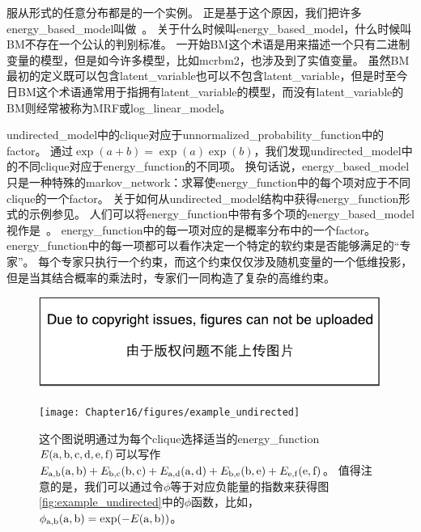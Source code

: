 服从形式的任意分布都是的一个实例。
正是基于这个原因，我们把许多\gls{energy_based_model}叫做~\citep{Fahlman83,Ackley85,Hinton84,Hinton86a}。
关于什么时候叫\gls{energy_based_model}，什么时候叫\gls{BM}不存在一个公认的判别标准。
一开始\gls{BM}这个术语是用来描述一个只有二进制变量的模型，但是如今许多模型，比如\gls{mcrbm2}，也涉及到了实值变量。
虽然\gls{BM}最初的定义既可以包含\gls{latent_variable}也可以不包含\gls{latent_variable}，但是时至今日\gls{BM}这个术语通常用于指拥有\gls{latent_variable}的模型，而没有\gls{latent_variable}的\gls{BM}则经常被称为\gls{MRF}或\gls{log_linear_model}。



\gls{undirected_model}中的\gls{clique}对应于\gls{unnormalized_probability_function}中的\gls{factor}。 
通过$\exp(a+b) = \exp(a) \exp(b)$，我们发现\gls{undirected_model}中的不同\gls{clique}对应于\gls{energy_function}的不同项。
换句话说，\gls{energy_based_model}只是一种特殊的\gls{markov_network}：求幂使\gls{energy_function}中的每个项对应于不同\gls{clique}的一个\gls{factor}。
关于如何从\gls{undirected_model}结构中获得\gls{energy_function}形式的示例参见。
人们可以将\gls{energy_function}中带有多个项的\gls{energy_based_model}视作是~\citep{Hinton99}。
\gls{energy_function}中的每一项对应的是概率分布中的一个\gls{factor}。
\gls{energy_function}中的每一项都可以看作决定一个特定的软约束是否能够满足的``专家''。
每个专家只执行一个约束，而这个约束仅仅涉及随机变量的一个低维投影，但是当其结合概率的乘法时，专家们一同构造了复杂的高维约束。



\begin{figure}[!htb]
\ifOpenSource
\centerline{\includegraphics{figure.pdf}}
\else
	\centerline{\texttt{[image: Chapter16/figures/example\_undirected]}}
\fi
\caption{这个图说明通过为每个\gls{clique}选择适当的\gls{energy_function} $E(\mathrm{a},\mathrm{b},\mathrm{c},\mathrm{d},\mathrm{e},\mathrm{f})$可以写作$E_{\mathrm{a},\mathrm{b}}(\mathrm{a},\mathrm{b}) + E_{\mathrm{b},\mathrm{c}}(\mathrm{b},\mathrm{c}) + E_{\mathrm{a},\mathrm{d}}(\mathrm{a},\mathrm{d})+  E_{\mathrm{b},\mathrm{e}}(\mathrm{b},\mathrm{e}) + E_{\mathrm{e},\mathrm{f}}(\mathrm{e},\mathrm{f})$。
值得注意的是，我们可以通过令$\phi$等于对应负能量的指数来获得图\ref{fig:example_undirected}中的$\phi$函数，比如，$\phi_{\mathrm{a},\mathrm{b}}(\mathrm{a},\mathrm{b}) = \exp(-E(\mathrm{a},\mathrm{b}))$。}
	\label{fig:example_undirected_2}
\end{figure}


